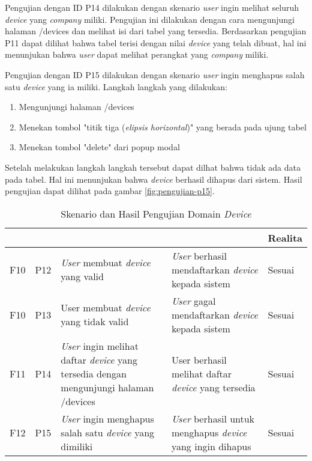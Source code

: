 Pengujian dengan ID P14 dilakukan dengan skenario \textit{user} ingin melihat seluruh \textit{device} yang \textit{company} miliki. Pengujian ini dilakukan dengan cara mengunjungi halaman /devices dan melihat isi dari tabel yang tersedia. Berdasarkan pengujian P11 dapat dilihat bahwa tabel terisi dengan nilai \textit{device} yang telah dibuat, hal ini menunjukan bahwa \textit{user} dapat melihat perangkat yang \textit{company} miliki.

Pengujian dengan ID P15 dilakukan dengan skenario \textit{user} ingin menghapus salah satu \textit{device} yang ia miliki. Langkah langkah yang dilakukan:
\begin{enumerate}
  \item Mengunjungi halaman /devices
  \item Menekan tombol "titik tiga (\textit{elipsis horizontal})" yang berada pada ujung tabel
  \item Menekan tombol "delete" dari popup modal
\end{enumerate}

Setelah melakukan langkah langkah tersebut dapat dilhat bahwa tidak ada data pada tabel. Hal ini menunjukan bahwa \textit{device} berhasil dihapus dari sistem. Hasil pengujian dapat dilihat pada gambar \ref{fig:pengujian-p15}.


\bgroup
\begin{table}[ht]
  \def\arraystretch{1.3}
  \caption{Skenario dan Hasil Pengujian Domain \textit{Device}}
  \label{tab:pengujian-domain-device}
  \centering
  \begin{tabular}{|p{2cm}|p{2cm}|p{4cm}|p{3cm}|p{2cm}|}
    \hline
    \centering{ID Fungsional} & \centering{ID Pengujian} & \centering{Skenario}                                                                                 & \centering{Ekspektasi}                                                    & Realita \\
    \hline
    F10                       & P12                      & \textit{User} membuat \textit{device} yang valid                                                     & \textit{User} berhasil mendaftarkan \textit{device} kepada sistem         & Sesuai  \\
    \hline
    F10                       & P13                      & {User} membuat \textit{device} yang tidak valid                                                      & \textit{User} gagal mendaftarkan \textit{device} kepada sistem            & Sesuai  \\
    \hline
    F11                       & P14                      & \textit{User} ingin melihat daftar \textit{device} yang tersedia dengan mengunjungi halaman /devices & User berhasil melihat daftar \textit{device} yang tersedia                & Sesuai  \\
    \hline
    F12                       & P15                      & \textit{User} ingin menghapus salah satu \textit{device} yang dimiliki                               & \textit{User} berhasil untuk menghapus \textit{device} yang ingin dihapus & Sesuai  \\
    \hline
  \end{tabular}
\end{table}
\egroup